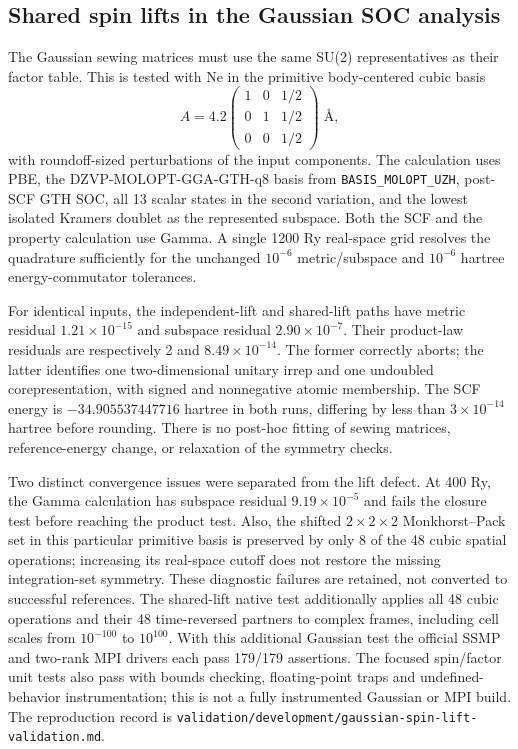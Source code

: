 \documentclass[11pt]{article}
\begin{document}
\subsection{Shared spin lifts in the Gaussian SOC analysis}
The Gaussian sewing matrices must use the same SU(2) representatives
as their factor table. This is tested with Ne in the primitive
body-centered cubic basis
\begin{equation}
 A=4.2\begin{pmatrix}1&0&1/2\\0&1&1/2\\0&0&1/2\end{pmatrix}
 \;\text{\AA},
\end{equation}
with roundoff-sized perturbations of the input components.
The calculation uses PBE, the DZVP-MOLOPT-GGA-GTH-q8 basis from
\texttt{BASIS\_MOLOPT\_UZH}, post-SCF GTH SOC, all 13 scalar
states in the second variation, and the lowest isolated Kramers
doublet as the represented subspace. Both the SCF and the property
calculation use Gamma. A single 1200 Ry real-space grid resolves the
quadrature sufficiently for the unchanged $10^{-6}$ metric/subspace
and $10^{-6}$ hartree energy-commutator tolerances.

For identical inputs, the independent-lift and shared-lift paths have
metric residual $1.21\times10^{-15}$ and subspace residual
$2.90\times10^{-7}$. Their product-law residuals are respectively
2 and $8.49\times10^{-14}$. The former correctly aborts; the latter
identifies one two-dimensional unitary irrep and one undoubled
corepresentation, with signed and nonnegative atomic membership.
The SCF energy is $-34.905537447716$ hartree in both runs, differing
by less than $3\times10^{-14}$ hartree before rounding. There is no
post-hoc fitting of sewing matrices, reference-energy change, or
relaxation of the symmetry checks.

Two distinct convergence issues were separated from the lift defect.
At 400 Ry, the Gamma calculation has subspace residual
$9.19\times10^{-5}$ and fails the closure test before reaching the
product test. Also, the shifted $2\times2\times2$ Monkhorst--Pack set
in this particular primitive basis is preserved by only 8 of the
48 cubic spatial operations; increasing its real-space cutoff does
not restore the missing integration-set symmetry. These diagnostic
failures are retained, not converted to successful references.
The shared-lift native test additionally applies all 48 cubic
operations and their 48 time-reversed partners to complex frames,
including cell scales from $10^{-100}$ to $10^{100}$.
With this additional Gaussian test the official SSMP and two-rank MPI
drivers each pass 179/179 assertions. The focused spin/factor unit
tests also pass with bounds checking, floating-point traps and
undefined-behavior instrumentation; this is not a fully instrumented
Gaussian or MPI build.
The reproduction record is
\texttt{validation/development/gaussian-spin-lift-validation.md}.
\end{document}
